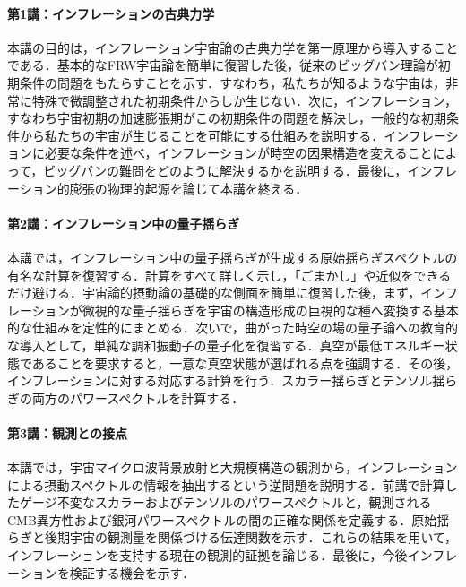 \begin{abstract}
5回の連続講義を通じて，インフレーション宇宙論を概観する．まずFriedmann--Robertson--Walker（FRW）宇宙論における初期条件の問題を説明し，宇宙初期の加速膨張期であるインフレーションが，これらの問題をどのように解決するかを述べる．次に，インフレーションが微視的な量子揺らぎを宇宙の構造形成の巨視的な種へと変換する仕組みを説明する．スカラー揺らぎとテンソル揺らぎの原始スペクトルを求める有名な計算を，詳細に提示する．そのうえで，宇宙マイクロ波背景放射の揺らぎの観測からインフレーション期の情報を抽出するという逆問題を定式化する．インフレーションを支持する現在の観測的証拠と，今後の検証の可能性を論じる．最後に，弦理論におけるインフレーションを解説し，インフレーションを基礎物理と結びつける際の課題を概観する．
\end{abstract}

\paragraph{第1講：インフレーションの古典力学}
本講の目的は，インフレーション宇宙論の古典力学を第一原理から導入することである．基本的なFRW宇宙論を簡単に復習した後，従来のビッグバン理論が初期条件の問題をもたらすことを示す．すなわち，私たちが知るような宇宙は，非常に特殊で微調整された初期条件からしか生じない．次に，インフレーション，すなわち宇宙初期の加速膨張期がこの初期条件の問題を解決し，一般的な初期条件から私たちの宇宙が生じることを可能にする仕組みを説明する．インフレーションに必要な条件を述べ，インフレーションが時空の因果構造を変えることによって，ビッグバンの難問をどのように解決するかを説明する．最後に，インフレーション的膨張の物理的起源を論じて本講を終える．

\paragraph{第2講：インフレーション中の量子揺らぎ}
本講では，インフレーション中の量子揺らぎが生成する原始揺らぎスペクトルの有名な計算を復習する．計算をすべて詳しく示し，「ごまかし」や近似をできるだけ避ける．宇宙論的摂動論の基礎的な側面を簡単に復習した後，まず，インフレーションが微視的な量子揺らぎを宇宙の構造形成の巨視的な種へ変換する基本的な仕組みを定性的にまとめる．次いで，曲がった時空の場の量子論への教育的な導入として，単純な調和振動子の量子化を復習する．真空が最低エネルギー状態であることを要求すると，一意な真空状態が選ばれる点を強調する．その後，インフレーションに対する対応する計算を行う．スカラー揺らぎとテンソル揺らぎの両方のパワースペクトルを計算する．

\paragraph{第3講：観測との接点}
本講では，宇宙マイクロ波背景放射と大規模構造の観測から，インフレーションによる摂動スペクトルの情報を抽出するという逆問題を説明する．前講で計算したゲージ不変なスカラーおよびテンソルのパワースペクトルと，観測されるCMB異方性および銀河パワースペクトルの間の正確な関係を定義する．原始揺らぎと後期宇宙の観測量を関係づける伝達関数を示す．これらの結果を用いて，インフレーションを支持する現在の観測的証拠を論じる．最後に，今後インフレーションを検証する機会を示す．

